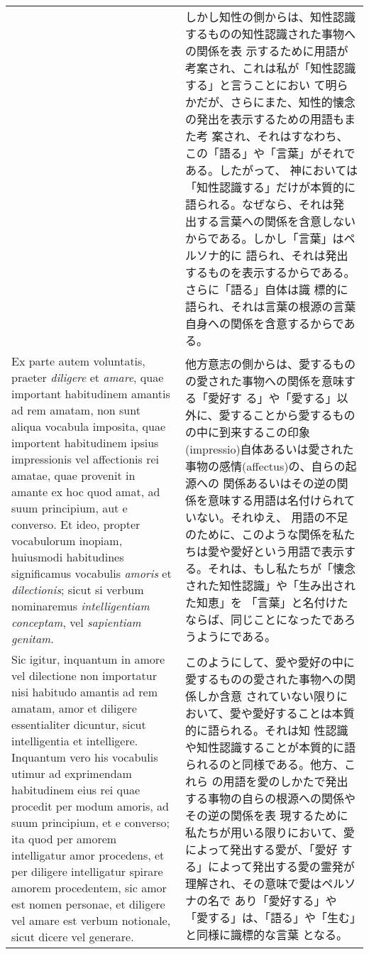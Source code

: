 \documentclass[10pt]{jsarticle} %
\begin{document}
\begin{longtable}{p{21em}p{21em}}
&

しかし知性の側からは、知性認識するものの知性認識された事物への関係を表
示するために用語が考案され、これは私が「知性認識する」と言うことにおい
て明らかだが、さらにまた、知性的懐念の発出を表示するための用語もまた考
案され、それはすなわち、この「語る」や「言葉」がそれである。したがって、
神においては「知性認識する」だけが本質的に語られる。なぜなら、それは発
出する言葉への関係を含意しないからである。しかし「言葉」はペルソナ的に
語られ、それは発出するものを表示するからである。さらに「語る」自体は識
標的に語られ、それは言葉の根源の言葉自身への関係を含意するからである。

\\


Ex parte autem voluntatis, praeter {\itshape diligere} et {\itshape
amare}, quae important habitudinem amantis ad rem amatam, non sunt
aliqua vocabula imposita, quae importent habitudinem ipsius
impressionis vel affectionis rei amatae, quae provenit in amante ex
hoc quod amat, ad suum principium, aut e converso. Et ideo, propter
vocabulorum inopiam, huiusmodi habitudines significamus vocabulis
{\itshape amoris} et {\itshape dilectionis}; sicut si verbum
nominaremus {\itshape intelligentiam conceptam}, vel {\itshape
sapientiam genitam}.


&

他方意志の側からは、愛するものの愛された事物への関係を意味する「愛好す
る」や「愛する」以外に、愛することから愛するものの中に到来するこの印象
(impressio)自体あるいは愛された事物の感情(affectus)の、自らの起源への
関係あるいはその逆の関係を意味する用語は名付けられていない。それゆえ、
用語の不足のために、このような関係を私たちは愛や愛好という用語で表示す
る。それは、もし私たちが「懐念された知性認識」や「生み出された知恵」を
「言葉」と名付けたならば、同じことになったであろうようにである。


\\


Sic igitur, inquantum in amore vel dilectione non importatur
nisi habitudo amantis ad rem amatam, amor et diligere essentialiter
dicuntur, sicut intelligentia et intelligere. Inquantum vero his
vocabulis utimur ad exprimendam habitudinem eius rei quae procedit per
modum amoris, ad suum principium, et e converso; ita quod per amorem
intelligatur amor procedens, et per diligere intelligatur spirare
amorem procedentem, sic amor est nomen personae, et diligere vel amare
est verbum notionale, sicut dicere vel generare.


&

このようにして、愛や愛好の中に愛するものの愛された事物への関係しか含意
されていない限りにおいて、愛や愛好することは本質的に語られる。それは知
性認識や知性認識することが本質的に語られるのと同様である。他方、これら
の用語を愛のしかたで発出する事物の自らの根源への関係やその逆の関係を表
現するために私たちが用いる限りにおいて、愛によって発出する愛が、「愛好
する」によって発出する愛の霊発が理解され、その意味で愛はペルソナの名で
あり「愛好する」や「愛する」は、「語る」や「生む」と同様に識標的な言葉
となる。


\end{longtable}
\end{document}
